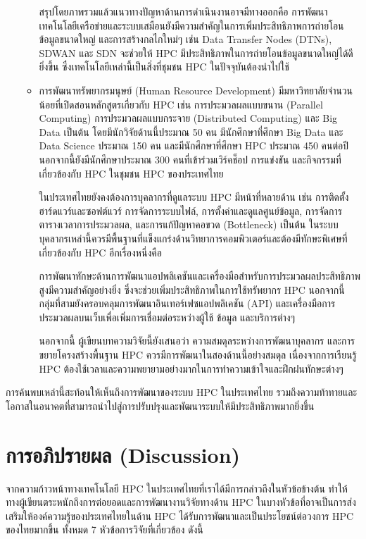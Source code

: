 \documentclass[a4paper,12pt]{extarticle}
\begin{document}
\begin{enumerate}
\begin{itemize}
		สรุปโดยภาพรวมแล้วแนวทางปัญหาด้านการดำเนินงานอาจมีทางออกคือ การพัฒนาเทคโนโลยีเครือข่ายและระบบเสมือนยังมีความสำคัญในการเพิ่มประสิทธิภาพการถ่ายโอนข้อมูลขนาดใหญ่ และการสร้างกลไกใหม่ๆ เช่น Data Transfer Nodes (DTNs), SDWAN และ SDN จะช่วยให้ HPC มีประสิทธิภาพในการถ่ายโอนข้อมูลขนาดใหญ่ได้ดียิ่งขึ้น ซึ่งเทคโนโลยีเหล่านี้เป็นสิ่งที่ชุมชน HPC ในปัจจุบันต้องนำไปใช้
		\item การพัฒนาทรัพยากรมนุษย์ (Human Resource Development) มีมหาวิทยาลัยจำนวนน้อยที่เปิดสอนหลักสูตรเกี่ยวกับ HPC เช่น การประมวลผลแบบขนาน (Parallel Computing) การประมวลผลแบบกระจาย (Distributed Computing) และ Big Data เป็นต้น โดยมีนักวิจัยด้านนี้ประมาณ 50 คน มีนักศึกษาที่ศึกษา Big Data และ Data Science ประมาณ 150 คน และมีนักศึกษาที่ศึกษา HPC ประมาณ 450 คนต่อปี นอกจากนี้ยังมีนักศึกษาประมาณ 300 คนที่เข้าร่วมเวิร์คช็อป การแข่งขัน และกิจกรรมที่เกี่ยวข้องกับ HPC ในชุมชน HPC ของประเทศไทย

		ในประเทศไทยยังคงต้องการบุคลากรที่ดูแลระบบ HPC มีหน้าที่หลายด้าน เช่น การติดตั้งฮาร์ดแวร์และซอฟต์แวร์ การจัดการระบบไฟล์, การตั้งค่าและดูแลศูนย์ข้อมูล, การจัดการตารางเวลาการประมวลผล, และการแก้ปัญหาคอขวด (Bottleneck) เป็นต้น ในระบบ บุคลากรเหล่านี้ควรมีพื้นฐานที่แข็งแกร่งด้านวิทยาการคอมพิวเตอร์และต้องมีทักษะพิเศษที่เกี่ยวข้องกับ HPC
		อีกเรื่องหนึ่งคือ

		การพัฒนาทักษะด้านการพัฒนาแอปพลิเคชันและเครื่องมือสำหรับการประมวลผลประสิทธิภาพสูงมีความสำคัญอย่างยิ่ง ซึ่งจะช่วยเพิ่มประสิทธิภาพในการใช้ทรัพยากร HPC นอกจากนี้ กลุ่มที่สามยังครอบคลุมการพัฒนาอินเทอร์เฟซแอปพลิเคชัน (API) และเครื่องมือการประมวลผลบนเว็บเพื่อเพิ่มการเชื่อมต่อระหว่างผู้ใช้ ข้อมูล และบริการต่างๆ

		นอกจากนี้ ผู้เขียนบทความวิจัยนี้ยังเสนอว่า ความสมดุลระหว่างการพัฒนาบุคลากร และการขยายโครงสร้างพื้นฐาน HPC ควรมีการพัฒนาในสองด้านนี้อย่างสมดุล เนื่องจากการเรียนรู้ HPC ต้องใช้เวลาและความพยายามอย่างมากในการทำความเข้าใจและฝึกฝนทักษะต่างๆ
	\end{itemize}
\end{enumerate}
การค้นพบเหล่านี้สะท้อนให้เห็นถึงการพัฒนาของระบบ HPC ในประเทศไทย รวมถึงความท้าทายและโอกาสในอนาคตที่สามารถนำไปสู่การปรับปรุงและพัฒนาระบบให้มีประสิทธิภาพมากยิ่งขึ้น


\newpage

\section{การอภิปรายผล (Discussion)}
จากความก้าวหน้าทางเทคโนโลยี HPC ในประเทศไทยที่เราได้มีการกล่าวถึงในหัวข้อข้างต้น ทำให้ทางผู้เขียนตระหนักถึงการต่อยอดและการพัฒนางานวิจัยทางด้าน HPC ในบางหัวข้อที่อาจเป็นการส่งเสริมให้องค์ความรู้ของประเทศไทยในด้าน HPC ได้รับการพัฒนาและเป็นประโยชน์ต่อวงการ HPC ของไทยมากขึ้น ทั้งหมด 7 หัวข้อการวิจัยที่เกี่ยวข้อง ดังนี้
\end{document}
